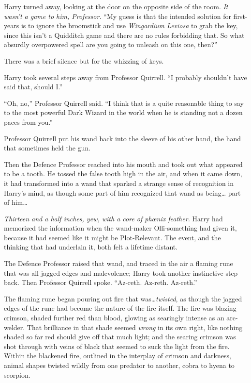 Harry turned away, looking at the door on the opposite side of the room. \emph{It wasn’t a game to him, Professor.} “My guess is that the intended solution for first-years is to ignore the broomstick and use \emph{Wingardium Leviosa} to grab the key, since this isn’t a Quidditch game and there are no rules forbidding that. So what absurdly overpowered spell are you going to unleash on this one, then?”

There was a brief silence but for the whizzing of keys.

Harry took several steps away from Professor Quirrell. “I probably shouldn’t have said that, should I.”

“Oh, no,” Professor Quirrell said. “I think that is a quite reasonable thing to say to the most powerful Dark Wizard in the world when he is standing not a dozen paces from you.”

Professor Quirrell put his wand back into the sleeve of his other hand, the hand that sometimes held the gun.

Then the Defence Professor reached into his mouth and took out what appeared to be a tooth. He tossed the false tooth high in the air, and when it came down, it had transformed into a wand that sparked a strange sense of recognition in Harry’s mind, as though some part of him recognized that wand as being… part of him…

\emph{Thirteen and a half inches, yew, with a core of phœnix feather.} Harry had memorized the information when the wand-maker Olli-something had given it, because it had seemed like it might be Plot-Relevant. The event, and the thinking that had underlain it, both felt a lifetime distant.

The Defence Professor raised that wand, and traced in the air a flaming rune that was all jagged edges and malevolence; Harry took another instinctive step back. Then Professor Quirrell spoke. “Az-reth. Az-reth. Az-reth.”

The flaming rune began pouring out fire that was…\emph{twisted}, as though the jagged edges of the rune had become the nature of the fire itself. The fire was blazing crimson, shaded further red than blood, glowing as searingly intense as an arc-welder. That brilliance in that shade seemed \emph{wrong} in its own right, like nothing shaded so far red should give off that much light; and the searing crimson was shot through with veins of black that seemed to suck the light from the fire. Within the blackened fire, outlined in the interplay of crimson and darkness, animal shapes twisted wildly from one predator to another, cobra to hyena to scorpion.

